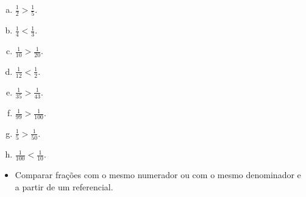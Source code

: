 \begin{solucao}{}{}
  \begin{multicols}{2}
\begin{enumerate}[a)]
 \item $\frac{1}{2}>\frac{1}{5}$.
\item $\frac{1}{4}<\frac{1}{3}$.
\item $\frac{1}{10}>\frac{1}{20}$.
\item $\frac{1}{12}<\frac{1}{2}$.
\item $\frac{1}{35}>\frac{1}{43}$.
\item  $\frac{1}{99}>\frac{1}{100}$.
\item  $\frac{1}{5}>\frac{1}{50}$.
\item  $\frac{1}{100}<\frac{1}{10}$.
\end{enumerate}
  \end{multicols}
\end{solucao}

\begin{objetivos}[label=chap3-ativ15]{}{}
\begin{itemize} %
    \item       Comparar frações com o mesmo numerador ou com o mesmo denominador e a partir de um referencial.
\end{itemize} %
\end{objetivos}

